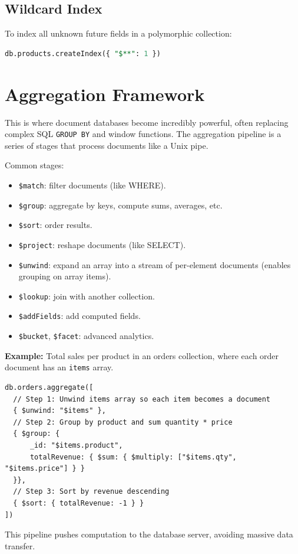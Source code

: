 \documentclass[12pt,a4paper]{article}
\begin{document}
\subsection{Wildcard Index}
To index all unknown future fields in a polymorphic collection:
\begin{lstlisting}[language=SQL]
db.products.createIndex({ "$**": 1 })
\end{lstlisting}

\section{Aggregation Framework}
This is where document databases become incredibly powerful, often replacing complex SQL \texttt{GROUP BY} and window functions. The aggregation pipeline is a series of stages that process documents like a Unix pipe.

Common stages:
\begin{itemize}[noitemsep]
    \item \texttt{\$match}: filter documents (like WHERE).
    \item \texttt{\$group}: aggregate by keys, compute sums, averages, etc.
    \item \texttt{\$sort}: order results.
    \item \texttt{\$project}: reshape documents (like SELECT).
    \item \texttt{\$unwind}: expand an array into a stream of per-element documents (enables grouping on array items).
    \item \texttt{\$lookup}: join with another collection.
    \item \texttt{\$addFields}: add computed fields.
    \item \texttt{\$bucket}, \texttt{\$facet}: advanced analytics.
\end{itemize}

\textbf{Example:} Total sales per product in an orders collection, where each order document has an \texttt{items} array.
\begin{lstlisting}[caption=Aggregation pipeline, label=lst:agg]
db.orders.aggregate([
  // Step 1: Unwind items array so each item becomes a document
  { $unwind: "$items" },
  // Step 2: Group by product and sum quantity * price
  { $group: {
      _id: "$items.product",
      totalRevenue: { $sum: { $multiply: ["$items.qty", "$items.price"] } }
  }},
  // Step 3: Sort by revenue descending
  { $sort: { totalRevenue: -1 } }
])
\end{lstlisting}
This pipeline pushes computation to the database server, avoiding massive data transfer.
\end{document}
